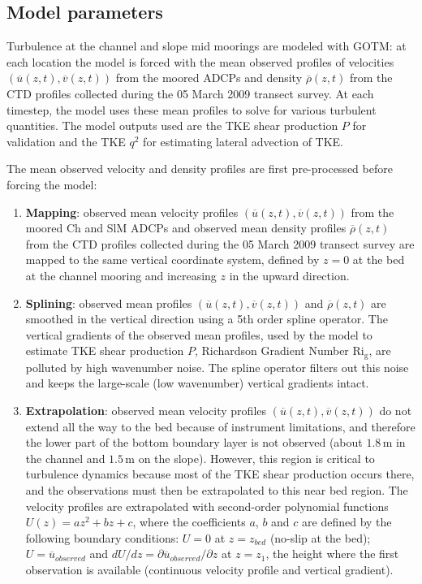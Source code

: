 \subsection{Model parameters}

Turbulence at the channel and slope mid moorings are modeled with GOTM: at each location the model is forced with the mean observed profiles of velocities $(\overline{u}(z,t), \overline{v}(z,t))$ from the moored ADCPs and density $\overline{\rho}(z,t)$ from the CTD profiles collected during the 05 March 2009 transect survey. At each timestep, the model uses these mean profiles to solve for various turbulent quantities. The model outputs used are the TKE shear production $P$ for validation and the TKE $q^2$ for estimating lateral advection of TKE.

The mean observed velocity and density profiles are first pre-processed before forcing the model:
\begin{enumerate}
\item \textbf{Mapping}: observed mean velocity profiles $(\overline{u}(z,t), \overline{v}(z,t))$ from the moored Ch and SlM ADCPs and observed mean density profiles $\overline{\rho}(z,t)$ from the CTD profiles collected during the 05 March 2009 transect survey are mapped to the same vertical coordinate system, defined by $z=0$ at the bed at the channel mooring and increasing $z$ in the upward direction. 
\item \textbf{Splining}: observed mean profiles $(\overline{u}(z,t), \overline{v}(z,t))$ and $\overline{\rho}(z,t)$ are smoothed in the vertical direction using a 5th order spline operator.   
The vertical gradients of the observed mean profiles, used by the model to estimate TKE shear production $P$, Richardson Gradient Number $\mathrm{Ri_g}$, are polluted by high wavenumber noise. The spline operator filters out this noise and keeps the large-scale (low wavenumber) vertical gradients intact. 
\item \textbf{Extrapolation}: observed mean velocity profiles $(\overline{u}(z,t), \overline{v}(z,t))$ do not extend all the way to the bed because of instrument limitations, and therefore the lower part of the bottom boundary layer is not observed (about $1.8\,\mathrm{m}$ in the channel and $1.5\,\mathrm{m}$ on the slope). However, this region is critical to turbulence dynamics because most of the TKE shear production occurs there, and the observations must then be extrapolated to this near bed region. The velocity profiles are extrapolated with second-order polynomial functions $U(z) = az^2 + bz +c$, where the coefficients $a$, $b$ and $c$ are defined by the following boundary conditions: $U= 0$ at $z=z_{bed}$ (no-slip at the bed); $U = \overline{u}_{observed}$ and $dU / dz =  \partial \overline{u}_{observed} / \partial z$ at $z=z_1$, the height where the first observation is available (continuous velocity profile and vertical gradient).
\end{enumerate}

